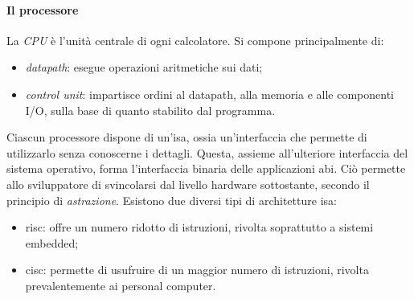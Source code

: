 \documentclass[class=book, crop=false, oneside]{standalone}
\begin{document}
\paragraph*{Il processore}
La \emph{CPU} è l'unità centrale di ogni calcolatore. Si compone principalmente di:
\begin{itemize}
	\item \emph{datapath}: esegue operazioni aritmetiche sui dati;
	\item \emph{control unit}: impartisce ordini al datapath, alla memoria e alle componenti I/O, sulla base di quanto stabilito dal programma.
\end{itemize}
Ciascun processore dispone di un'\acrfull{isa}, ossia un'interfaccia che permette di utilizzarlo senza conoscerne i dettagli.
Questa, assieme all'ulteriore interfaccia del sistema operativo, forma l'interfaccia binaria delle applicazioni \acrfull{abi}.
Ciò permette allo sviluppatore di svincolarsi dal livello hardware sottostante, secondo il principio di \emph{astrazione}. Esistono due diversi tipi di architetture \acrshort{isa}:
\begin{itemize}
	\item \acrshort{risc}: offre un numero ridotto di istruzioni, rivolta soprattutto a sistemi embedded;
	\item \acrshort{cisc}: permette di usufruire di un maggior numero di istruzioni, rivolta prevalentemente ai personal computer.
\end{itemize}
\end{document}

